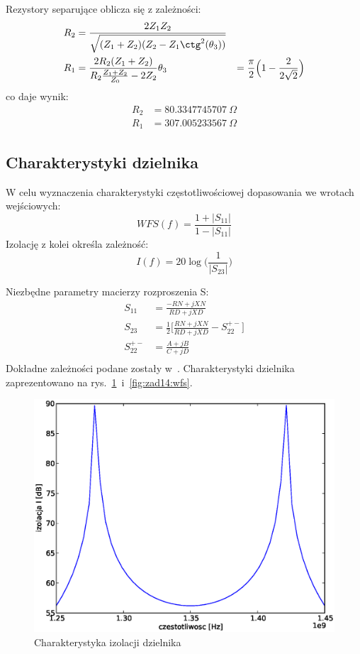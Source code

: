 \documentclass[rep.tex]{subfiles}
\begin{document}
Rezystory separujące oblicza się z zależności:
\begin{align}
  R_2 &= \frac{2 Z_1 Z_2}{\sqrt{(Z_1 + Z_2)(Z_2 - Z_1\ctg^2(\theta_3))}} \\
  R_1 &= \frac{2 R_2(Z_1 + Z_2)}{R_2 \frac{Z_1 + Z_2}{Z_0} - 2Z_2}
  \theta_3 &= \frac{ \pi}{2} \Big(1 - \frac{2}{2\sqrt{2}} \Big)
\end{align}
co daje wynik:
\begin{align}
  R_2 &= 80.3347745707~\Omega \nonumber \\
  R_1 &= 307.005233567~\Omega \nonumber
\end{align}

\subsection{Charakterystyki dzielnika}
W celu wyznaczenia charakterystyki częstotliwościowej dopasowania we wrotach wejściowych:
\begin{equation}
  WFS(f) = \frac{1 + |S_{11}|}{1 - |S_{11}|} \label{eqn:zad14:wfs}
\end{equation}
Izolację z kolei określa zależność:
\begin{equation}
  I(f) = 20 \log \Big( \frac{1}{|S_{23}|} \Big) \label{eqn:zad14:I}
\end{equation}

Niezbędne parametry macierzy rozproszenia S:
\begin{align}
  S_{11} &= \frac{-RN + jXN}{RD + jXD} \\
  S_{23} &= \frac{1}{2} \bigg[\frac{RN + jXN}{RD + jXD} - S_{22}^{+-}\bigg] \\
  S_{22}^{+-} &= \frac{A + jB}{C + jD} \\
\end{align}
Dokładne zależności podane zostały w~\cite{obwody}.
Charakterystyki dzielnika zaprezentowano na rys.~\ref{fig:zad14:iso}~i~\ref{fig:zad14:wfs}.

\begin{figure}[!htbp]
  \centering
  \includegraphics[scale=0.5]{fig/zad14/iso}
  \caption{Charakterystyka izolacji dzielnika}
  \label{fig:zad14:iso}
\end{figure}
\end{document}
